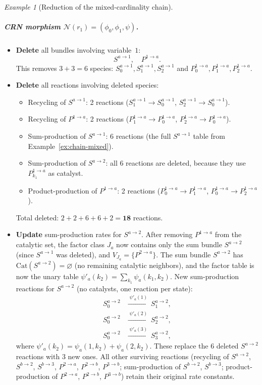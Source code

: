 \documentclass{article}
\theoremstyle{plain}
\theoremstyle{definition}
\theoremstyle{remark}
\newtheorem{example}{Example}[section]
\newcommand{\<}{\langle}
\renewcommand{\>}{\rangle}
\begin{document}
\begin{example}[Reduction of the mixed-cardinality chain]
\subparagraph{CRN morphism $\mathcal{N}(r_1)=(\phi_0,\phi_1,\psi)$.}
 
\begin{itemize}
\item[$\phi_0$:] \textbf{Delete} all bundles involving variable~$1$:
  \[
  S^{a\to 1},\quad P^{1\to a}.
  \]
  This removes $3+3=6$ species:
  $S^{a\to 1}_0, S^{a\to 1}_1, S^{a\to 1}_2$ and
  $P^{1\to a}_0, P^{1\to a}_1, P^{1\to a}_2$.
 
\item[$\phi_1$:] \textbf{Delete} all reactions involving deleted species:
  \begin{itemize}
  \item Recycling of $S^{a\to 1}$: 2 reactions
    ($S^{a\to 1}_1\to S^{a\to 1}_0$,\;
     $S^{a\to 1}_2\to S^{a\to 1}_0$).
  \item Recycling of $P^{1\to a}$: 2 reactions
    ($P^{1\to a}_1\to P^{1\to a}_0$,\;
     $P^{1\to a}_2\to P^{1\to a}_0$).
  \item Sum-production of $S^{a\to 1}$: 6 reactions
    (the full $S^{a\to 1}$ table from Example~\ref{ex:chain-mixed}).
  \item Sum-production of $S^{a\to 2}$: all 6 reactions are deleted,
    because they use $P^{1\to a}_{k_1}$ as catalyst.
  \item Product-production of $P^{1\to a}$: 2 reactions
    ($P^{1\to a}_0\to P^{1\to a}_1$,\;
     $P^{1\to a}_0\to P^{1\to a}_2$).
  \end{itemize}
  Total deleted: $2+2+6+6+2=\mathbf{18}$ reactions.
 
\item[$\psi$:] \textbf{Update} sum-production rates for $S^{a\to 2}$.
  After removing $P^{1\to a}$ from the catalytic set, the factor class
  $J_a$ now contains only the sum bundle $S^{a\to 2}$ (since
  $S^{a\to 1}$ was deleted), and $V_{J_a}=\{P^{2\to a}\}$.
  The sum bundle $S^{a\to 2}$ has $\mathrm{Cat}(S^{a\to 2})=\varnothing$
  (no remaining catalytic neighbors), and the factor table is now the
  unary table $\psi'_a(k_2)=\sum_{k_1}\psi_a(k_1,k_2)$.
  New sum-production reactions for $S^{a\to 2}$
  (no catalysts, one reaction per state):
  \begin{align*}
  S^{a\to 2}_0
    &\xrightarrow{\;\psi'_a(1)\;}
    S^{a\to 2}_1,
  \\
  S^{a\to 2}_0
    &\xrightarrow{\;\psi'_a(2)\;}
    S^{a\to 2}_2,
  \\
  S^{a\to 2}_0
    &\xrightarrow{\;\psi'_a(3)\;}
    S^{a\to 2}_3,
  \end{align*}
  where $\psi'_a(k_2) = \psi_a(1,k_2)+\psi_a(2,k_2)$.
  These replace the 6 deleted $S^{a\to 2}$ reactions with 3 new ones.
  All other surviving reactions (recycling of $S^{a\to 2}$, $S^{b\to 2}$,
  $S^{b\to 3}$, $P^{2\to a}$, $P^{2\to b}$, $P^{3\to b}$;
  sum-production of $S^{b\to 2}$, $S^{b\to 3}$;
  product-production of $P^{2\to a}$, $P^{2\to b}$, $P^{3\to b}$)
  retain their original rate constants.
\end{itemize}
 

\end{example}
\end{document}
